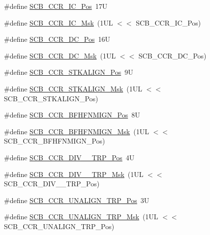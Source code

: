 \begin{DoxyCompactItemize}
\item 
\#define \mbox{\hyperlink{group__CMSIS__SCB_ga33f0f2a0818b2570f3e00b7e79501448}{S\+C\+B\+\_\+\+C\+C\+R\+\_\+\+I\+C\+\_\+\+Pos}}~17U
\item 
\#define \mbox{\hyperlink{group__CMSIS__SCB_gaf2ff8f5957edac919e28b536aa6c0a59}{S\+C\+B\+\_\+\+C\+C\+R\+\_\+\+I\+C\+\_\+\+Msk}}~(1\+U\+L $<$$<$ S\+C\+B\+\_\+\+C\+C\+R\+\_\+\+I\+C\+\_\+\+Pos)
\item 
\#define \mbox{\hyperlink{group__CMSIS__SCB_gaa1896a99252649cfb96139b56ba87d9b}{S\+C\+B\+\_\+\+C\+C\+R\+\_\+\+D\+C\+\_\+\+Pos}}~16U
\item 
\#define \mbox{\hyperlink{group__CMSIS__SCB_ga57b3909dff40a9c28ec50991e4202678}{S\+C\+B\+\_\+\+C\+C\+R\+\_\+\+D\+C\+\_\+\+Msk}}~(1\+U\+L $<$$<$ S\+C\+B\+\_\+\+C\+C\+R\+\_\+\+D\+C\+\_\+\+Pos)
\item 
\#define \mbox{\hyperlink{group__CMSIS__SCB_gac2d20a250960a432cc74da59d20e2f86}{S\+C\+B\+\_\+\+C\+C\+R\+\_\+\+S\+T\+K\+A\+L\+I\+G\+N\+\_\+\+Pos}}~9U
\item 
\#define \mbox{\hyperlink{group__CMSIS__SCB_ga33cf22d3d46af158a03aad25ddea1bcb}{S\+C\+B\+\_\+\+C\+C\+R\+\_\+\+S\+T\+K\+A\+L\+I\+G\+N\+\_\+\+Msk}}~(1\+U\+L $<$$<$ S\+C\+B\+\_\+\+C\+C\+R\+\_\+\+S\+T\+K\+A\+L\+I\+G\+N\+\_\+\+Pos)
\item 
\#define \mbox{\hyperlink{group__CMSIS__SCB_ga4010a4f9e2a745af1b58abe1f791ebbf}{S\+C\+B\+\_\+\+C\+C\+R\+\_\+\+B\+F\+H\+F\+N\+M\+I\+G\+N\+\_\+\+Pos}}~8U
\item 
\#define \mbox{\hyperlink{group__CMSIS__SCB_ga89a28cc31cfc7d52d9d7a8fcc69c7eac}{S\+C\+B\+\_\+\+C\+C\+R\+\_\+\+B\+F\+H\+F\+N\+M\+I\+G\+N\+\_\+\+Msk}}~(1\+U\+L $<$$<$ S\+C\+B\+\_\+\+C\+C\+R\+\_\+\+B\+F\+H\+F\+N\+M\+I\+G\+N\+\_\+\+Pos)
\item 
\#define \mbox{\hyperlink{group__CMSIS__SCB_gac8d512998bb8cd9333fb7627ddf59bba}{S\+C\+B\+\_\+\+C\+C\+R\+\_\+\+D\+I\+V\+\_\+\_\+\+T\+R\+P\+\_\+\+Pos}}~4U
\item 
\#define \mbox{\hyperlink{group__CMSIS__SCB_gabb9aeac71b3abd8586d0297070f61dcb}{S\+C\+B\+\_\+\+C\+C\+R\+\_\+\+D\+I\+V\+\_\+\_\+\+T\+R\+P\+\_\+\+Msk}}~(1\+U\+L $<$$<$ S\+C\+B\+\_\+\+C\+C\+R\+\_\+\+D\+I\+V\+\_\+\_\+\+T\+R\+P\+\_\+\+Pos)
\item 
\#define \mbox{\hyperlink{group__CMSIS__SCB_gac4e4928b864ea10fc24dbbc57d976229}{S\+C\+B\+\_\+\+C\+C\+R\+\_\+\+U\+N\+A\+L\+I\+G\+N\+\_\+\+T\+R\+P\+\_\+\+Pos}}~3U
\item 
\#define \mbox{\hyperlink{group__CMSIS__SCB_ga68c96ad594af70c007923979085c99e0}{S\+C\+B\+\_\+\+C\+C\+R\+\_\+\+U\+N\+A\+L\+I\+G\+N\+\_\+\+T\+R\+P\+\_\+\+Msk}}~(1\+U\+L $<$$<$ S\+C\+B\+\_\+\+C\+C\+R\+\_\+\+U\+N\+A\+L\+I\+G\+N\+\_\+\+T\+R\+P\+\_\+\+Pos)

\end{DoxyCompactItemize}
